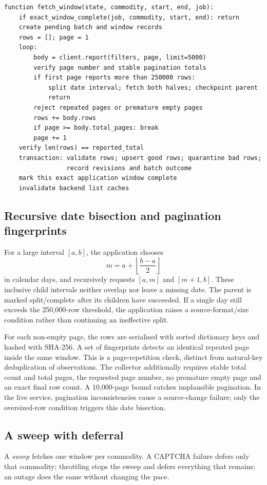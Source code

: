 \documentclass[12pt,a4paper,oneside]{report}
\numberwithin{equation}{chapter}
\numberwithin{figure}{chapter}
\numberwithin{table}{chapter}
\theoremstyle{definition}
\begin{document}
\begin{lstlisting}[caption={Fetching and checkpointing a report window}]
function fetch_window(state, commodity, start, end, job):
    if exact_window_complete(job, commodity, start, end): return
    create pending batch and window records
    rows = []; page = 1
    loop:
        body = client.report(filters, page, limit=5000)
        verify page number and stable pagination totals
        if first page reports more than 250000 rows:
            split date interval; fetch both halves; checkpoint parent
            return
        reject repeated pages or premature empty pages
        rows += body.rows
        if page >= body.total_pages: break
        page += 1
    verify len(rows) == reported_total
    transaction: validate rows; upsert good rows; quarantine bad rows;
                 record revisions and batch outcome
    mark this exact application window complete
    invalidate backend list caches
\end{lstlisting}

\subsection{Recursive date bisection and pagination fingerprints}
For a large interval $[a,b]$, the application chooses
\[
m=a+\left\lfloor\frac{b-a}{2}\right\rfloor
\]
in calendar days, and recursively requests $[a,m]$ and $[m+1,b]$. These inclusive child intervals neither overlap nor leave a missing date. The parent is marked split/complete after its children have succeeded. If a single day still exceeds the 250,000-row threshold, the application raises a source-format/size condition rather than continuing an ineffective split.

For each non-empty page, the rows are serialised with sorted dictionary keys and hashed with SHA-256. A set of fingerprints detects an identical repeated page inside the same window. This is a page-repetition check, distinct from natural-key deduplication of observations. The collector additionally requires stable total count and total pages, the requested page number, no premature empty page and an exact final row count. A 10,000-page bound catches implausible pagination. In the live service, pagination inconsistencies cause a source-change failure; only the oversized-row condition triggers this date bisection.

\subsection{A sweep with deferral}
A \emph{sweep} fetches one window per commodity. A CAPTCHA failure defers only that commodity; throttling stops the sweep and defers everything that remains; an outage does the same without changing the pace.
\end{document}
